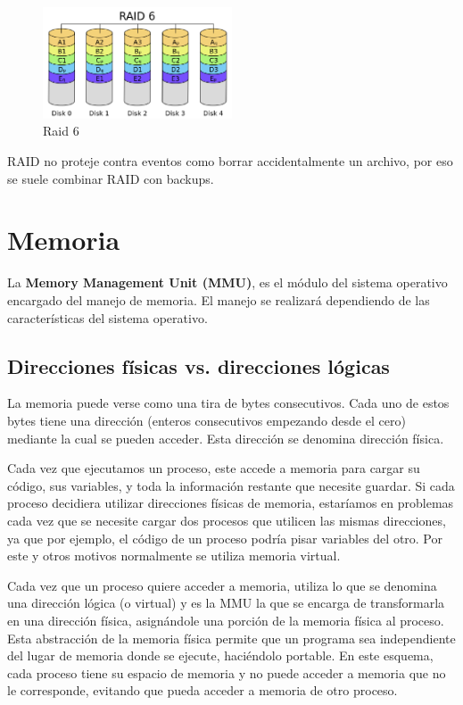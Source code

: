 \documentclass{article}
\begin{document}
\begin{itemize}
\begin{figure}[H]
    \centering
    \includegraphics[width=0.5\textwidth]{imgs/raid_6.png}
    \caption{Raid 6}
    \label{fig:raid_6}
\end{figure}

\end{itemize}

RAID no proteje contra eventos como borrar accidentalmente un archivo, por eso se suele combinar RAID con backups.

\section{Memoria}

La \textbf{Memory Management Unit (MMU)}, es el módulo del sistema operativo encargado del manejo de memoria. El manejo se realizará dependiendo de las características del sistema operativo.

\subsection{Direcciones f\'isicas vs. direcciones l\'ogicas}

La memoria puede verse como una tira de bytes consecutivos. Cada uno de estos bytes tiene una direcci\'on (enteros consecutivos empezando desde el cero) mediante la cual se pueden acceder. Esta direcci\'on se denomina direcci\'on f\'isica.

Cada vez que ejecutamos un proceso, este accede a memoria para cargar su c\'odigo, sus variables, y toda la informaci\'on restante que necesite guardar. Si cada proceso decidiera utilizar direcciones físicas de memoria, estar\'iamos en problemas cada vez que se necesite cargar dos procesos que utilicen las mismas direcciones, ya que por ejemplo, el c\'odigo de un proceso podr\'ia pisar variables del otro. Por este y otros motivos normalmente se utiliza memoria virtual.

Cada vez que un proceso quiere acceder a memoria, utiliza lo que se denomina una direcci\'on l\'ogica (o virtual) y es la MMU la que se encarga de transformarla en una direcci\'on f\'isica, asign\'andole una porci\'on de la memoria f\'isica al proceso. Esta abstracción de la memoria física permite que un programa sea independiente del lugar de memoria donde se ejecute, haciéndolo portable. En este esquema, cada proceso tiene su espacio de memoria y no puede acceder a memoria que no le corresponde, evitando que pueda acceder a memoria de otro proceso.
\end{document}
